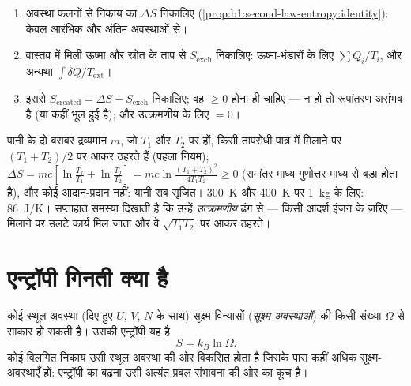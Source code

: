 \begin{method}[एन्ट्रॉपी का संतुलन बनाना]\label{met:b1:second-law-entropy:method}
\begin{enumerate}
  \item अवस्था फलनों से निकाय का $\Delta S$ निकालिए
        (\cref{prop:b1:second-law-entropy:identity}): केवल आरंभिक और
        अंतिम अवस्थाओं से।
  \item वास्तव में मिली ऊष्मा और स्रोत के ताप से $S_{\mathrm{exch}}$
        निकालिए: ऊष्मा-भंडारों के लिए $\sum Q_i/T_i$, और अन्यथा
        $\int\delta Q/T_{\mathrm{ext}}$।
  \item इससे $S_{\mathrm{created}} = \Delta S - S_{\mathrm{exch}}$ निकालिए; वह
        $\geq 0$ होना ही चाहिए --- न हो तो रूपांतरण असंभव है (या कहीं भूल
        हुई है); और उत्क्रमणीय के लिए $= 0$।
\end{enumerate}
\end{method}

\begin{example}[गरम और ठंडे का मिश्रण]\label{ex:b1:second-law-entropy:mixing}
पानी के दो बराबर द्रव्यमान $m$, जो $T_1$ और $T_2$ पर हों, किसी तापरोधी
पात्र में मिलाने पर $(T_1 + T_2)/2$ पर आकर ठहरते हैं (पहला नियम); $\Delta S = mc[\ln\frac{T_f}{T_1} + \ln\frac{T_f}{T_2}]
= mc\ln\frac{(T_1 + T_2)^2}{4T_1T_2} \geq 0$ (समांतर माध्य गुणोत्तर माध्य से
बड़ा होता है), और कोई आदान-प्रदान नहीं: यानी सब सृजित। \qty{300}{K} और
\qty{400}{K} पर \qty{1}{kg} के लिए: \qty{86}{J/K}। सप्ताहांत समस्या दिखाती
है कि उन्हें \emph{उत्क्रमणीय} ढंग से --- किसी आदर्श इंजन के ज़रिए ---
मिलाने पर उलटे कार्य मिल जाता और वे $\sqrt{T_1T_2}$ पर आकर ठहरते।
\end{example}

\section{एन्ट्रॉपी गिनती क्या है}

\begin{proposition}[बोल्ट्ज़मान का सूत्र]\label{prop:b1:second-law-entropy:boltzmann}
कोई स्थूल अवस्था (दिए हुए $U$, $V$, $N$ के साथ) सूक्ष्म विन्यासों
(\emph{सूक्ष्म-अवस्थाओं}) की किसी संख्या $\Omega$ से साकार हो सकती है।
उसकी एन्ट्रॉपी यह है
\[
S = k_B\ln\Omega .
\]
कोई विलगित निकाय उसी स्थूल अवस्था की ओर विकसित होता है जिसके पास कहीं
अधिक सूक्ष्म-अवस्थाएँ हों: एन्ट्रॉपी का बढ़ना उसी अत्यंत प्रबल संभावना की
ओर का कूच है।
\end{proposition}
\admitted

